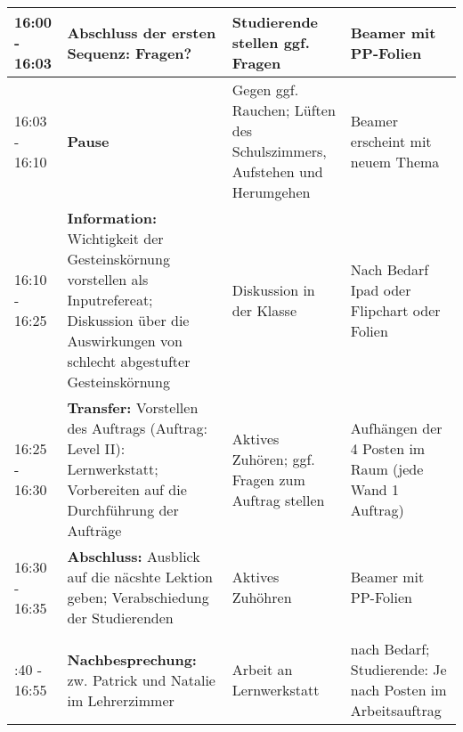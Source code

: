 \documentclass[
11pt,
captions=tableheading,
smallheadings,
headsepline,
footsepline, 
captions=tableheading,
parskip=half-,
]{scrartcl}
\begin{document}
\begin{landscape}
\begin{longtable}{@{}l|p{8.75cm}p{7.75cm}p{5.25cm}@{}}
        \midrule
        16:00 - 16:03 & \textbf{Abschluss der ersten Sequenz:} Fragen?                                                                                                                   & Studierende stellen ggf. Fragen                                                                                & Beamer mit PP-Folien                                                              \\
        \midrule
        16:03 - 16:10   & \textbf{Pause}                                                                                                                                                  & Gegen ggf. Rauchen; Lüften des Schulszimmers, Aufstehen und Herumgehen                                                                                             & Beamer erscheint mit neuem Thema                                                \\
        \midrule
        16:10 - 16:25 & \textbf{Information:} Wichtigkeit der Gesteinskörnung vorstellen als Inputrefereat; Diskussion über die Auswirkungen von schlecht abgestufter Gesteinskörnung & Diskussion in der Klasse                                                                                       & Nach Bedarf Ipad oder Flipchart oder Folien                                       \\
        \midrule
        16:25 - 16:30 & \textbf{Transfer:} Vorstellen des Auftrags (Auftrag: Level II): Lernwerkstatt; Vorbereiten auf die Durchführung der Aufträge                                                                                                   & Aktives Zuhören; ggf. Fragen zum Auftrag stellen                                                                               &Aufhängen der 4 Posten im Raum (jede Wand 1 Auftrag)                                       \\
        \midrule
        16:30 - 16:35 & \textbf{Abschluss:} Ausblick auf die näcshte Lektion geben; Verabschiedung der Studierenden                                                                      & Aktives Zuhöhren                                                                                                        & Beamer mit PP-Folien                                                              \\
        \midrule
        \\ \addlinespace
        \midrule
        16:40 - 16:55 & \textbf{Nachbesprechung:} zw. Patrick und Natalie im Lehrerzimmer                                                                                                & Arbeit an Lernwerkstatt                                                                                        & nach Bedarf; Studierende: Je nach Posten im Arbeitsauftrag                        \\

\end{longtable}
\end{landscape}
\end{document}
